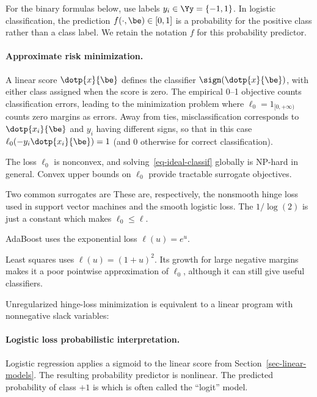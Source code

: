 For the binary formulas below, use labels $y_i \in \Yy = \{-1,1\}$. In logistic classification, the prediction $f(\cdot,\be) \in [0,1]$ is a probability for the positive class rather than a class label. We retain the notation $f$ for this probability predictor.


    
\paragraph{Approximate risk minimization.}

A linear score $\dotp{x}{\be}$ defines the classifier $\sign(\dotp{x}{\be})$, with either class assigned when the score is zero. The empirical 0--1 objective counts classification errors, leading to the minimization problem
where $\ell_0=1_{[0,+\infty)}$ counts zero margins as errors. Away from ties, misclassification corresponds to $\dotp{x_i}{\be}$ and $y_i$ having different signs, so that in this case $\ell_0(-y_i \dotp{x_i}{\be})=1$ (and 0 otherwise for correct classification).

The loss $\ell_0$ is nonconvex, and solving~\eqref{eq-ideal-classif} globally is NP-hard in general. Convex upper bounds on $\ell_0$ provide tractable surrogate objectives.

Two common surrogates are
These are, respectively, the nonsmooth hinge loss used in support vector machines and the smooth logistic loss. The $1/\log(2)$ is just a constant which makes $\ell_0 \leq \ell$.
  
AdaBoost uses the exponential loss $\ell(u)=e^u$.
 
Least squares uses $\ell(u)=(1+u)^2$. Its growth for large negative margins makes it a poor pointwise approximation of $\ell_0$, although it can still give useful classifiers.
  
Unregularized hinge-loss minimization is equivalent to a linear program with nonnegative slack variables:


    
\paragraph{Logistic loss probabilistic interpretation.}

Logistic regression applies a sigmoid to the linear score from Section~\ref{sec-linear-models}. The resulting probability predictor is nonlinear. The predicted probability of class $+1$ is
which is often called the ``logit'' model.
 
